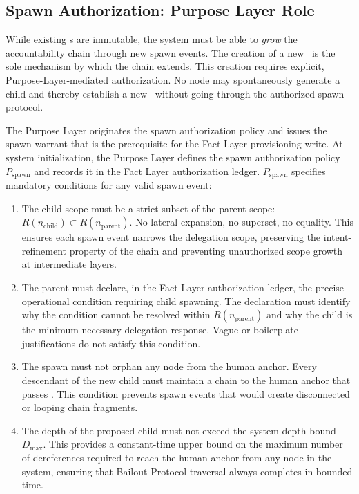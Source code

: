 \subsection{Spawn Authorization: Purpose Layer Role}
\label{sec:spawn-auth}

While existing \ParentPointer s are immutable, the system must be able to \emph{grow} the accountability chain through new spawn events. The creation of a new \ParentPointer\ is the sole mechanism by which the chain extends. This creation requires explicit, Purpose-Layer-mediated authorization. No node may spontaneously generate a child and thereby establish a new \ParentPointer\ without going through the authorized spawn protocol.

The Purpose Layer originates the spawn authorization policy and issues the spawn warrant that is the prerequisite for the Fact Layer provisioning write. At system initialization, the Purpose Layer defines the spawn authorization policy $P_{\mathrm{spawn}}$ and records it in the Fact Layer authorization ledger. $P_{\mathrm{spawn}}$ specifies mandatory conditions for any valid spawn event:

\begin{enumerate}
    \item[(S1) \textbf{Scope refinement.}] The child scope must be a strict subset of the parent scope: $R(n_{\mathrm{child}}) \subset R(n_{\mathrm{parent}})$. No lateral expansion, no superset, no equality. This ensures each spawn event narrows the delegation scope, preserving the intent-refinement property of the chain and preventing unauthorized scope growth at intermediate layers.

    \item[(S2) \textbf{Operational necessity.}] The parent must declare, in the Fact Layer authorization ledger, the precise operational condition requiring child spawning. The declaration must identify why the condition cannot be resolved within $R(n_{\mathrm{parent}})$ and why the child is the minimum necessary delegation response. Vague or boilerplate justifications do not satisfy this condition.

    \item[(S3) \textbf{Human anchor preservation.}] The spawn must not orphan any node from the human anchor. Every descendant of the new child must maintain a chain to the human anchor that passes \ChainVerify. This condition prevents spawn events that would create disconnected or looping chain fragments.

    \item[(S4) \textbf{Depth bound compliance.}] The depth of the proposed child must not exceed the system depth bound $D_{\max}$. This provides a constant-time upper bound on the maximum number of dereferences required to reach the human anchor from any node in the system, ensuring that Bailout Protocol traversal always completes in bounded time.
\end{enumerate}

